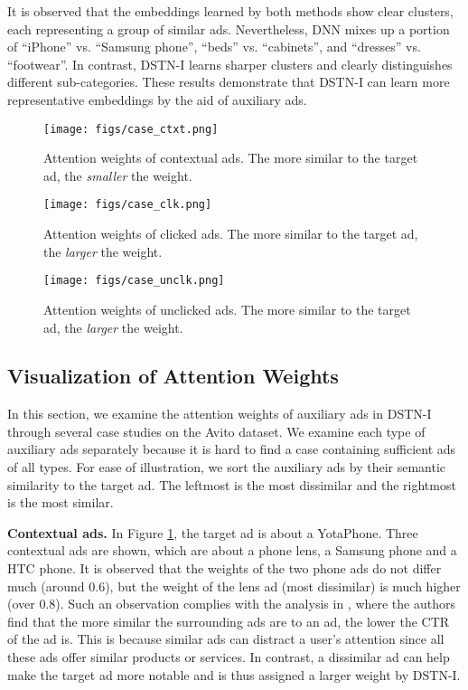 \documentclass[sigconf]{acmart}
\begin{document}
It is observed that the embeddings learned by both methods show clear clusters, each representing a group of similar ads. Nevertheless, DNN mixes up a portion of ``iPhone'' vs. ``Samsung phone'', ``beds'' vs. ``cabinets'', and ``dresses'' vs. ``footwear''. In contrast, DSTN-I learns sharper clusters and clearly distinguishes different sub-categories. These results demonstrate that DSTN-I can learn more representative embeddings by the aid of auxiliary ads.

\begin{figure}[!t]
\centering
\texttt{[image: figs/case\_ctxt.png]}
\vskip -8pt
\caption{Attention weights  of contextual ads. The more similar to the target ad, the \emph{smaller} the weight.}
\vskip -6pt
\label{case_ctxt}
\end{figure}

\begin{figure}[!t]
\centering
\texttt{[image: figs/case\_clk.png]}
\vskip -8pt
\caption{Attention weights  of clicked ads. The more similar to the target ad, the \emph{larger} the weight.}
\vskip -6pt
\label{case_clk}
\end{figure}

\begin{figure}[!t]
\centering
\texttt{[image: figs/case\_unclk.png]}
\vskip -8pt
\caption{Attention weights  of unclicked ads. The more similar to the target ad, the \emph{larger} the weight.}
\vskip -6pt
\label{case_unclk}
\end{figure}

\subsection{Visualization of Attention Weights}
In this section, we examine the attention weights of auxiliary ads in DSTN-I through several case studies on the Avito dataset. We examine each type of auxiliary ads separately because it is hard to find a case containing sufficient ads of all types. For ease of illustration, we sort the auxiliary ads by their semantic similarity to the target ad. The leftmost is the most dissimilar and the rightmost is the most similar.

\textbf{Contextual ads.} In Figure \ref{case_ctxt}, the target ad is about a YotaPhone. Three contextual ads are shown, which are about a phone lens, a Samsung phone and a HTC phone. It is observed that the weights of the two phone ads do not differ much (around 0.6), but the weight of the lens ad (most dissimilar) is much higher (over 0.8). Such an observation complies with the analysis in \cite{xiong2012relational}, where the authors find that the more similar the surrounding ads are to an ad, the lower the CTR of the ad is. This is because similar ads can distract a user's attention since all these ads offer similar products or services. In contrast, a dissimilar ad can help make the target ad more notable and is thus assigned a larger weight by DSTN-I.
\end{document}
